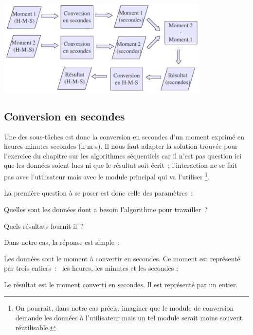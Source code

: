 		\begin{center}
		\includegraphics[width=0.8\textwidth]{image/module-conversion}
		\end{center}
	
	\subsection*{Conversion en secondes}
	
		Une des sous-tâches est donc la conversion en secondes
		d’un moment exprimé en heures-minutes-secondes
		(h-m-s). Il nous faut adapter la solution trouvée pour
		l’exercice du chapitre sur les algorithmes séquentiels
		car il n’est pas question ici que les données soient
		lues ni que le résultat soit écrit~; l’interaction ne
		se fait pas avec l’utilisateur mais avec le module
		principal qui va l’utiliser%
		\footnote{%
			On pourrait, dans notre cas précis, 
			imaginer que le module de conversion demande les données 
			à l’utilisateur mais un tel module serait
			moins souvent réutilisable.
		}.
	
		La première question à se poser est donc celle des paramètres~:
	
		\begin{liste}
		\item 
			Quelles sont les données dont a besoin l’algorithme
			pour travailler~?
		\item 
			Quels résultats fournit-il~?
		\end{liste}
	
		Dans notre cas, la réponse est simple~:
	
		\begin{liste}
		\item
			Les données sont le moment à convertir en secondes. 
			Ce moment est représenté par trois entiers~:~
			les heures, les minutes et les secondes ;
		\item
			Le résultat est le moment converti en secondes. 
			Il est représenté par un entier.
		\end{liste}
	
